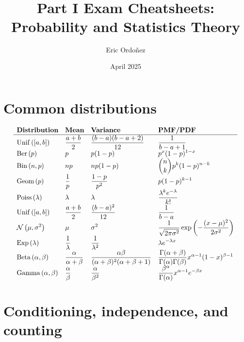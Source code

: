 \documentclass[a4paper]{article}
\title{Part I Exam Cheatsheets:\\Probability and Statistics Theory}
\author{Eric Ordo\~nez}
\date{April 2025}
\begin{document}
\maketitle

\section{Common distributions}
    {
    \renewcommand*{\arraystretch}{2.25}
    \[ \begin{array}{*4{>{\displaystyle}l}}
        \textbf{Distribution} & \textbf{Mean}       & \textbf{Variance}               & \textbf{PMF/PDF} \\ \hline
        \unifdist{a}{b}     & \frac{a + b}{2}   & \frac{(b - a)(b - a + 2)}{12} & \frac{1}{b - a + 1} \\
        \berdist{p}         & p                 & p(1 - p)                      & p^x (1 - p)^{1 - x} \\
        \bindist{n}{p}      & np                & np(1 - p)                     & \binom{n}{k} p^k (1 - p)^{n - k} \\
        \geomdist{p}        & \frac{1}{p}       & \frac{1 - p}{p^2}             & p(1 - p)^{k - 1} \\
        \poissdist{\lambda}     & \lambda           & \lambda                   & \frac{\lambda^k e^{-\lambda}}{k!} \\
        \unifdist{a}{b}         & \frac{a + b}{2}   & \frac{(b - a)^2}{12}      & \frac{1}{b - a} \\
        \ndist{\mu}{\sigma^2}   & \mu               & \sigma^2                  & \frac{1}{\sqrt{2 \pi \sigma^2}} \exp{\left(-\frac{(x - \mu)^2}{2 \sigma^2}\right)} \\
        \expdist{\lambda}       & \frac{1}{\lambda} & \frac{1}{\lambda^2}       & \lambda e^{-\lambda x} \\
        \betadist{\alpha}{\beta}    & \frac{\alpha}{\alpha + \beta} & \frac{\alpha \beta}{(\alpha + \beta)^2 (\alpha + \beta + 1)}  & \frac{\Gamma(\alpha + \beta)}{\Gamma(\alpha) \Gamma(\beta)} x^{\alpha - 1} (1 - x)^{\beta - 1} \\
        \gammadist{\alpha}{\beta}   & \frac{\alpha}{\beta}          & \frac{\alpha}{\beta^2}                                        & \frac{\beta^\alpha}{\Gamma(\alpha)} x^{\alpha - 1} e^{-\beta x}
    \end{array} \]    
    }

\section{Conditioning, independence, and counting}
\end{document}
